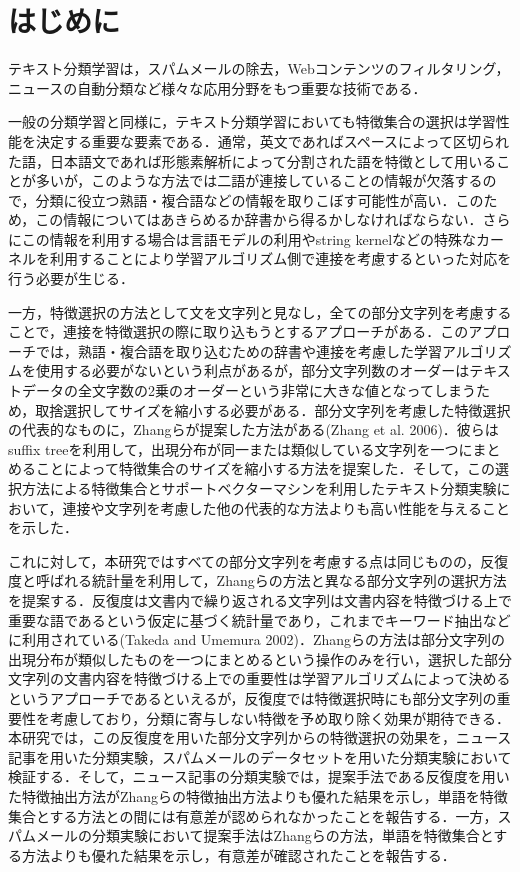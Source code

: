 \documentclass[japanese]{jnlp_1.4}
\begin{document}
\maketitle

\section{はじめに}

テキスト分類学習は，スパムメールの除去，Webコンテンツのフィルタリング，ニュースの自動分類など様々な応用分野をもつ重要な技術である．

一般の分類学習と同様に，テキスト分類学習においても特徴集合の選択は学習性能を決定する重要な要素である．通常，英文であればスペースによって区切られた語，日本語文であれば形態素解析によって分割された語を特徴として用いることが多いが，このような方法では二語が連接していることの情報が欠落するので，分類に役立つ熟語・複合語などの情報を取りこぼす可能性が高い．このため，この情報についてはあきらめるか辞書から得るかしなければならない．さらにこの情報を利用する場合は言語モデルの利用やstring 
kernelなどの特殊なカーネルを利用することにより学習アルゴリズム側で連接を考慮するといった対応を行う必要が生じる．

一方，特徴選択の方法として文を文字列と見なし，全ての部分文字列を考慮することで，連接を特徴選択の際に取り込もうとするアプローチがある．このアプローチでは，熟語・複合語を取り込むための辞書や連接を考慮した学習アルゴリズムを使用する必要がないという利点があるが，部分文字列数のオーダーはテキストデータの全文字数の2乗のオーダーという非常に大きな値となってしまうため，取捨選択してサイズを縮小する必要がある．部分文字列を考慮した特徴選択の代表的なものに，Zhangらが提案した方法がある(Zhang et al. 2006)．彼らはsuffix 
treeを利用して，出現分布が同一または類似している文字列を一つにまとめることによって特徴集合のサイズを縮小する方法を提案した．そして，この選択方法による特徴集合とサポートベクターマシンを利用したテキスト分類実験において，連接や文字列を考慮した他の代表的な方法よりも高い性能を与えることを示した．

これに対して，本研究ではすべての部分文字列を考慮する点は同じものの，反復度と呼ばれる統計量を利用して，Zhangらの方法と異なる部分文字列の選択方法を提案する．反復度は文書内で繰り返される文字列は文書内容を特徴づける上で重要な語であるという仮定に基づく統計量であり，これまでキーワード抽出などに利用されている(Takeda and Umemura 2002)．Zhangらの方法は部分文字列の出現分布が類似したものを一つにまとめるという操作のみを行い，選択した部分文字列の文書内容を特徴づける上での重要性は学習アルゴリズムによって決めるというアプローチであるといえるが，反復度では特徴選択時にも部分文字列の重要性を考慮しており，分類に寄与しない特徴を予め取り除く効果が期待できる．本研究では，この反復度を用いた部分文字列からの特徴選択の効果を，ニュース記事を用いた分類実験，スパムメールのデータセットを用いた分類実験において検証する．そして，ニュース記事の分類実験では，提案手法である反復度を用いた特徴抽出方法がZhangらの特徴抽出方法よりも優れた結果を示し，単語を特徴集合とする方法との間には有意差が認められなかったことを報告する．一方，スパムメールの分類実験において提案手法はZhangらの方法，単語を特徴集合とする方法よりも優れた結果を示し，有意差が確認されたことを報告する．
\end{document}
